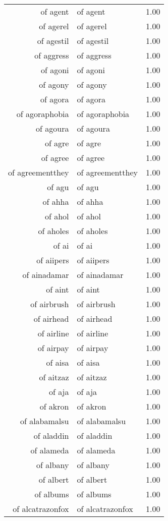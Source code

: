 \begin{table}[ht]
\begin{tabular}{rlr}
  of agent & of agent & 1.00 \\ 
  of agerel & of agerel & 1.00 \\ 
  of agestil & of agestil & 1.00 \\ 
  of aggress & of aggress & 1.00 \\ 
  of agoni & of agoni & 1.00 \\ 
  of agony & of agony & 1.00 \\ 
  of agora & of agora & 1.00 \\ 
  of agoraphobia & of agoraphobia & 1.00 \\ 
  of agoura & of agoura & 1.00 \\ 
  of agre & of agre & 1.00 \\ 
  of agree & of agree & 1.00 \\ 
  of agreementthey & of agreementthey & 1.00 \\ 
  of agu & of agu & 1.00 \\ 
  of ahha & of ahha & 1.00 \\ 
  of ahol & of ahol & 1.00 \\ 
  of aholes & of aholes & 1.00 \\ 
  of ai & of ai & 1.00 \\ 
  of aiipers & of aiipers & 1.00 \\ 
  of ainadamar & of ainadamar & 1.00 \\ 
  of aint & of aint & 1.00 \\ 
  of airbrush & of airbrush & 1.00 \\ 
  of airhead & of airhead & 1.00 \\ 
  of airline & of airline & 1.00 \\ 
  of airpay & of airpay & 1.00 \\ 
  of aisa & of aisa & 1.00 \\ 
  of aitzaz & of aitzaz & 1.00 \\ 
  of aja & of aja & 1.00 \\ 
  of akron & of akron & 1.00 \\ 
  of alabamalsu & of alabamalsu & 1.00 \\ 
  of aladdin & of aladdin & 1.00 \\ 
  of alameda & of alameda & 1.00 \\ 
  of albany & of albany & 1.00 \\ 
  of albert & of albert & 1.00 \\ 
  of albums & of albums & 1.00 \\ 
  of alcatrazonfox & of alcatrazonfox & 1.00 \\ 

\end{tabular}
\end{table}
